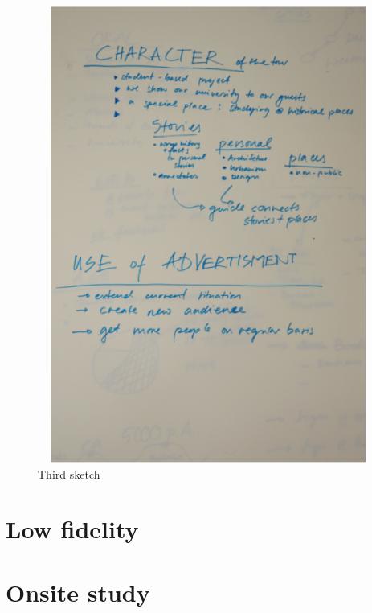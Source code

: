 \begin{figure}[H]
    \centering
    \includegraphics[width=12cm,height=15cm]{Appendices/4/sk3}%
    \caption{Third sketch}%
    \label{fig:Sk3}%
\end{figure}


\chapter {Low fidelity}
\label{AppendixC} 
\setcounter{figure}{0}




\chapter {Onsite study}
\label{AppendixD} 
\setcounter{figure}{0}




